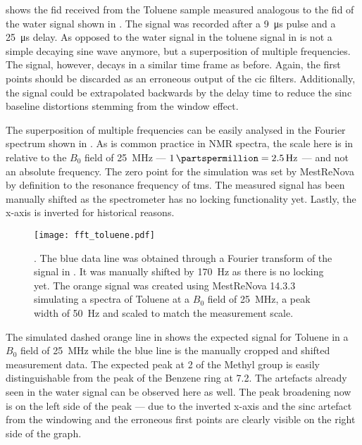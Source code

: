  shows the \acrshort{fid} received from the Toluene sample measured analogous to the \acrshort{fid} of the water signal shown in . The signal was recorded after a \qty{9}{\micro\second} pulse and a \qty{25}{\micro\second} delay. As opposed to the water signal in  the toluene signal in  is not a simple decaying sine wave anymore, but a superposition of multiple frequencies. The signal, however, decays in a similar time frame as before. Again, the first points should be discarded as an erroneous output of the \acrshort{cic} filters. Additionally, the signal could be extrapolated backwards by the delay time to reduce the sinc baseline distortions stemming from the window effect.

The superposition of multiple frequencies can be easily analysed in the Fourier spectrum shown in . As is common practice in NMR spectra, the scale here is in \unit{\partspermillion} relative to the \(B_0\) field of \qty{25}{\mega\hertz} --- \(\qty{1}{\partspermillion} = \qty{2.5}{\hertz}\) --- and not an absolute frequency. The zero point for the simulation was set by MestReNova by definition to the resonance frequency of \acrshort{tms}.  The measured signal has been manually shifted as the spectrometer has no locking functionality yet. Lastly, the x-axis is inverted for historical reasons.

\begin{figure}[h!bt]
    \centering
    \texttt{[image: fft\_toluene.pdf]}
    \caption{. The blue data line was obtained through a Fourier transform of the signal in . It was manually shifted by \qty{170}{\hertz} as there is no locking yet. The orange signal was created using MestReNova 14.3.3 simulating a spectra of Toluene at a $B_0$ field of \qty{25}{\mega\hertz}, a peak width of \qty{50}{\hertz} and scaled to match the measurement scale.}
\end{figure}

The simulated dashed orange line in  shows the expected signal for Toluene in a \(B_0\) field of \qty{25}{\mega\hertz} while the blue line is the manually cropped and shifted measurement data. The expected peak at \qty{2}{\partspermillion} of the Methyl group is easily distinguishable from the peak of the Benzene ring at \approx{}\qty{7.2}{\partspermillion}. The artefacts already seen in the water signal can be observed here as well. The peak broadening now is on the left side of the peak --- due to the inverted x-axis and the sinc artefact from the windowing and the erroneous first points are clearly visible on the right side of the graph.